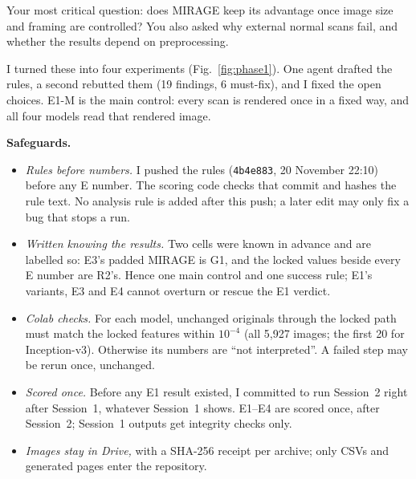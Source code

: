 \documentclass[10pt,a4paper]{article}
\newcommand{\hash}[1]{\texttt{\footnotesize #1}}
\newenvironment{parts}{\begin{description}[style=unboxed, leftmargin=0pt, itemsep=3pt, font=\normalfont\bfseries\itshape]}{\end{description}}
\begin{document}
\begin{parts}
\item[The problem.] Your most critical question: does MIRAGE keep its advantage once image size and framing are
controlled? You also asked why external normal scans fail, and whether the results depend on preprocessing.
\item[What I changed.] I turned these into four experiments (Fig.~\ref{fig:phase1}). One agent drafted the rules, a
second rebutted them (19 findings, 6 must-fix), and I fixed the open choices. E1-M is the main control: every scan
is rendered once in a fixed way, and all four models read that rendered image.

\smallskip
\noindent\textbf{Safeguards.}
\begin{itemize}
  \item \emph{Rules before numbers.} I pushed the rules (\hash{4b4e883}, 20 November 22:10) before any E number.
        The scoring code checks that commit and hashes the rule text. No analysis rule is added after this push;
        a later edit may only fix a bug that stops a run.
  \item \emph{Written knowing the results.} Two cells were known in advance and are labelled so: E3's padded
        MIRAGE is G1, and the locked values beside every E number are R2's. Hence one main control and one
        success rule; E1's variants, E3 and E4 cannot overturn or rescue the E1 verdict.
  \item \emph{Colab checks.} For each model, unchanged originals through the locked path must match the locked
        features within $10^{-4}$ (all 5,927 images; the first 20 for Inception-v3). Otherwise its numbers are
        ``not interpreted''. A failed step may be rerun once, unchanged.
  \item \emph{Scored once.} Before any E1 result existed, I committed to run Session~2 right after Session~1,
        whatever Session~1 shows. E1--E4 are scored once, after Session~2; Session~1 outputs get integrity
        checks only.
  \item \emph{Images stay in Drive,} with a SHA-256 receipt per archive; only CSVs and generated pages enter the
        repository.
\end{itemize}


\end{parts}
\end{document}
